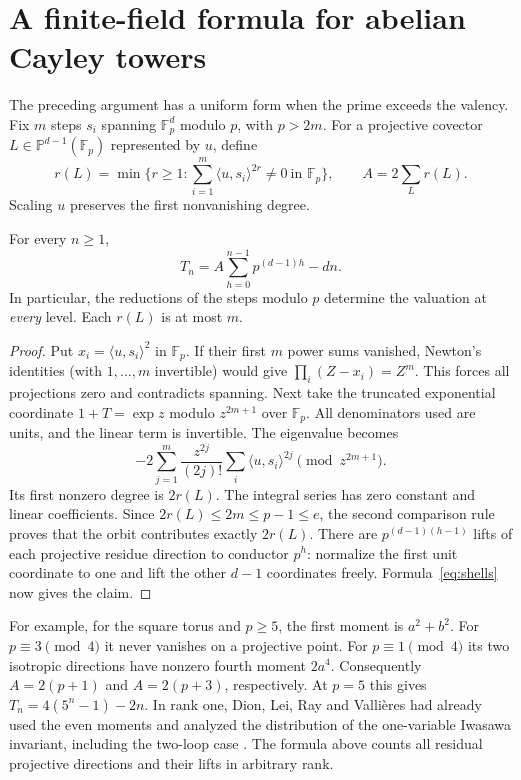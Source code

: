 \section{A finite-field formula for abelian Cayley towers}\label{sec:moments}
The preceding argument has a uniform form when the prime exceeds the
valency. Fix $m$ steps $s_i$ spanning $\mathbb F_p^d$ modulo $p$, with
$p>2m$. For a projective covector $L\in\mathbb P^{d-1}(\mathbb F_p)$
represented by $u$, define
\[
 r(L)=\min\{r\ge1:\textstyle\sum_{i=1}^m\langle u,s_i\rangle^{2r}
                       \ne0\ \text{in }\mathbb F_p\},
 \qquad A=2\sum_L r(L).
\]
Scaling $u$ preserves the first nonvanishing degree.

\begin{theorem}\label{thm:moments}
For every $n\ge1$,
\[
 \boxed{\displaystyle T_n=A\sum_{h=0}^{n-1}p^{(d-1)h}-dn.}
\]
In particular, the reductions of the steps modulo $p$ determine the
valuation at \emph{every} level. Each $r(L)$ is at most $m$.
\end{theorem}

\begin{proof}
Put $x_i=\langle u,s_i\rangle^2$ in $\mathbb F_p$. If their first $m$
power sums vanished, Newton's identities (with $1,\ldots,m$ invertible)
would give $\prod_i(Z-x_i)=Z^m$. This forces all projections zero and
contradicts spanning. Next take the truncated exponential coordinate
$1+T=\exp z$ modulo $z^{2m+1}$ over $\mathbb F_p$. All denominators used
are units, and the linear term is invertible. The eigenvalue becomes
\[
 -2\sum_{j=1}^m\frac{z^{2j}}{(2j)!}
                 \sum_i\langle u,s_i\rangle^{2j}
                 \pmod {z^{2m+1}} .
\]
Its first nonzero degree is $2r(L)$. The integral series has zero constant
and linear coefficients. Since $2r(L)\le2m\le p-1\le e$, the second
comparison rule proves that the orbit contributes exactly $2r(L)$.
There are $p^{(d-1)(h-1)}$ lifts of each projective residue direction to
conductor $p^h$: normalize the first unit coordinate to one and lift the
other $d-1$ coordinates freely. Formula~\eqref{eq:shells} now gives the claim.
\end{proof}

For example, for the square torus and $p\ge5$, the first moment is
$a^2+b^2$. For $p\equiv3\pmod4$ it never vanishes on a projective point.
For $p\equiv1\pmod4$ its two isotropic directions have nonzero fourth
moment $2a^4$. Consequently $A=2(p+1)$ and $A=2(p+3)$, respectively.
At $p=5$ this gives $T_n=4(5^n-1)-2n$. In rank one, Dion, Lei, Ray and
Vallières had already used the even moments and analyzed the distribution
of the one-variable Iwasawa invariant, including the two-loop case
\cite[Theorem 4.13 and Proposition 4.19]{DLRV}. The formula above counts
all residual projective directions and their lifts in arbitrary rank.

